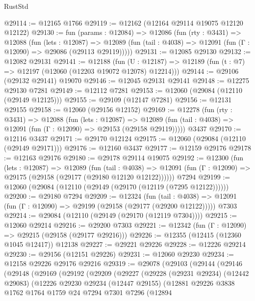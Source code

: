 \begin{lexlean}{RustStd}
\begin{coremodule}
@29114 := @12165 @1766
@29119 := @12162 (@12164 @29114 @19075 @12120 @12122)
@29130 := fun (params : @12084) =>
  @12086
    (fun (rty : @3431) =>
    @12088
      (fun (lets : @12087) =>
      @12089 (fun (tail : @4038) => @12091 (fun (Γ : @12090) => @29086 (@29113 @29119)))))
@29131 := @12085 @29130
@29132 := @12082 @29131
@29141 := @12188
    (fun (U : @12187) => @12189 (fun (t : @7) => @12197 (@12060 (@12203 @19072 @12078) @12214)))
@29144 := @29106 (@29132 @29141) @19070
@29146 := @12045 @29131 @29141
@29148 := @12275 @29130 @7281
@29149 := @12112 @7281
@29153 := @12060 (@29084 (@12110 (@29149 @12125)))
@29155 := @29109 (@12147 @7281)
@29156 := @12131 @29155
@29158 := @12060 (@29156 @12152)
@29169 := @12278
    (fun (rty : @3431) =>
    @12088
      (fun (lets : @12087) =>
      @12089 (fun (tail : @4038) => @12091 (fun (Γ : @12090) => @29153 (@29158 @29119)))))
    @3437
@29170 := @12116 @3437
@29171 := @29170 @12124
@29175 := @12060 (@29084 (@12110 (@29149 @29171)))
@29176 := @12160 @3437
@29177 := @12159 @29176
@29178 := @12163 @29176
@29180 := @29178 @29114 @19075
@29192 := @12300
    (fun (lets : @12087) =>
    @12089
      (fun (tail : @4038) =>
      @12091 (fun (Γ : @12090) => @29175 (@29158 (@29177 (@29180 @12120 @12122))))))
    @7294
@29199 := @12060 (@29084 (@12110 (@29149 (@29170 (@12119 (@7295 @12122))))))
@29200 := @29180 @7294
@29209 := @12324
    (fun (tail : @4038) => @12091 (fun (Γ : @12090) => @29199 (@29158 (@29177 (@29200 @12122)))))
    @7303
@29214 := @29084 (@12110 (@29149 (@29170 (@12119 @7304))))
@29215 := @12060 @29214
@29216 := @29200 @7303
@29221 := @12342 (fun (Γ : @12090) => @29215 (@29158 (@29177 @29216)))
@29226 := @12355 (@12415 (@12360 @1045 @12417)) @12138
@29227 := @29221 @29226
@29228 := @12226 @29214
@29230 := @29156 (@12151 @29226)
@29231 := @12060 @29230
@29234 := @12158 @29226 @29176 @29216
@29319 := @29078
    (@29103
      (@29144
        (@29146
          (@29148
            (@29169
              (@29192
                (@29209
                  (@29227
                    (@29228
                      (@29231 @29234)
                      (@12442 @29083)
                      (@12226
                        @29230
                        @29234
                        (@12447 @29155)
                        (@12881
                          @29226
                          @3838
                          @1762
                          @1764
                          @1759
                          @24
                          @7294
                          @7301
                          @7296
                          (@12894

\end{coremodule}
\end{lexlean}
